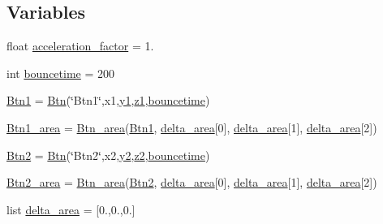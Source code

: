 \subsection*{Variables}
\begin{DoxyCompactItemize}
\item 
float \hyperlink{namespaceRET__config_a425bc201cf7b10f0c4f1068f752e7c9b}{acceleration\+\_\+factor} = 1.
\item 
int \hyperlink{namespaceRET__config_a6c0865cd5d0010294697d27a2e89069d}{bouncetime} = 200
\item 
\hyperlink{namespaceRET__config_af037c6b9ff0314103d8127acc9d07e0b}{Btn1} = \hyperlink{classRET__config_1_1Btn}{Btn}(\char`\"{}Btn1\char`\"{},x1,\hyperlink{namespaceRET__config_a9fe80bf4738047a31d7c162807ed85f0}{y1},\hyperlink{namespaceRET__config_a7da4886c0a2e03b8bb9ed62eb20efb78}{z1},\hyperlink{namespaceRET__config_a6c0865cd5d0010294697d27a2e89069d}{bouncetime})
\item 
\hyperlink{namespaceRET__config_a118140d2896d1aff1e3c9355f9deb314}{Btn1\+\_\+area} = \hyperlink{classRET__config_1_1Btn__area}{Btn\+\_\+area}(\hyperlink{namespaceRET__config_af037c6b9ff0314103d8127acc9d07e0b}{Btn1}, \hyperlink{namespaceRET__config_abbf3fd8fafae6a457e57109bfaf9a6c5}{delta\+\_\+area}\mbox{[}0\mbox{]}, \hyperlink{namespaceRET__config_abbf3fd8fafae6a457e57109bfaf9a6c5}{delta\+\_\+area}\mbox{[}1\mbox{]}, \hyperlink{namespaceRET__config_abbf3fd8fafae6a457e57109bfaf9a6c5}{delta\+\_\+area}\mbox{[}2\mbox{]})
\item 
\hyperlink{namespaceRET__config_a73afa8c52cebd94e1889df5fbe3bec66}{Btn2} = \hyperlink{classRET__config_1_1Btn}{Btn}(\char`\"{}Btn2\char`\"{},x2,\hyperlink{namespaceRET__config_a07bcd014e69eddcf4243b2a961014eaf}{y2},\hyperlink{namespaceRET__config_a55196b87940893e540ba636218f4eb07}{z2},\hyperlink{namespaceRET__config_a6c0865cd5d0010294697d27a2e89069d}{bouncetime})
\item 
\hyperlink{namespaceRET__config_a51a4083768cbc17b22a98ad63a7bf851}{Btn2\+\_\+area} = \hyperlink{classRET__config_1_1Btn__area}{Btn\+\_\+area}(\hyperlink{namespaceRET__config_a73afa8c52cebd94e1889df5fbe3bec66}{Btn2}, \hyperlink{namespaceRET__config_abbf3fd8fafae6a457e57109bfaf9a6c5}{delta\+\_\+area}\mbox{[}0\mbox{]}, \hyperlink{namespaceRET__config_abbf3fd8fafae6a457e57109bfaf9a6c5}{delta\+\_\+area}\mbox{[}1\mbox{]}, \hyperlink{namespaceRET__config_abbf3fd8fafae6a457e57109bfaf9a6c5}{delta\+\_\+area}\mbox{[}2\mbox{]})
\item 
list \hyperlink{namespaceRET__config_abbf3fd8fafae6a457e57109bfaf9a6c5}{delta\+\_\+area} = \mbox{[}0.,0.,0.\mbox{]}

\end{DoxyCompactItemize}
